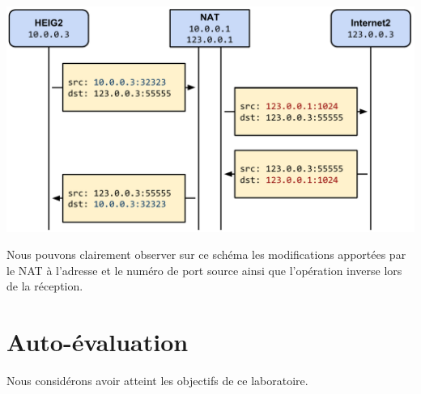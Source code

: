 \documentclass[11pt,a4paper]{article}
\begin{document}
\begin{center}
\includegraphics[width=14.5cm]{img_nat}
\end{center}

Nous pouvons clairement observer sur ce schéma les modifications apportées par le NAT à l'adresse et le numéro de port source ainsi que l'opération inverse lors de la réception.

\section{Auto-évaluation}

Nous considérons avoir atteint les objectifs de ce laboratoire.
\end{document}
